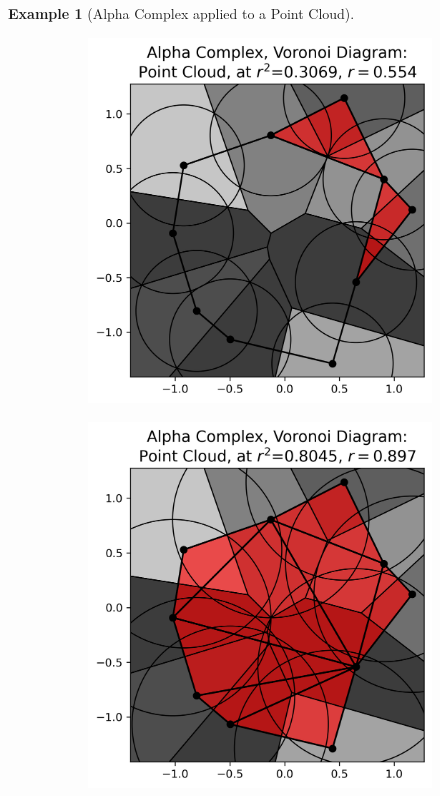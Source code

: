 \documentclass[ma]{uncgdissertationexp}
\theoremstyle{plain}
\theoremstyle{definition}
\newtheorem{example}[theorem]{Example}
\theoremstyle{remark}
\begin{document}
\begin{example}[Alpha Complex applied to a Point Cloud]
\begin{figure}[H]
\begin{subfigure}[b]{0.26\textwidth}
    \end{subfigure}
    \begin{subfigure}[b]{0.26\textwidth}
        \includegraphics[width=\textwidth]{point_cloud_plot_alpha_5.png}
    \end{subfigure}
    \begin{subfigure}[b]{0.26\textwidth}
        \includegraphics[width=\textwidth]{point_cloud_plot_alpha_6.png}

\end{subfigure}
\end{figure}
\end{example}
\end{document}

